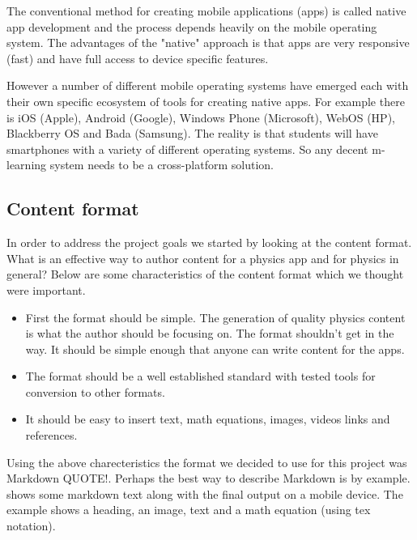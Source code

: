\documentclass[12pt,a4paper]{article}  %
\begin{document}
The conventional method for creating mobile applications (apps) is called native app development and the process depends heavily on the mobile operating system. The advantages of the "native" approach is that apps are very responsive (fast) and have full access to device specific features.

However a number of different mobile operating systems have emerged each with their own specific ecosystem of tools for creating native apps. For example there is iOS (Apple), Android (Google), Windows Phone (Microsoft), WebOS (HP), Blackberry OS and Bada (Samsung). The reality is that students will have smartphones with a variety of different operating systems. So any decent m-learning system needs to be a cross-platform solution.



\subsection{Content format}

In order to address the project goals we started by looking at the content
format. What is an effective way to author content for a physics app and for
physics in general? Below are some characteristics of the content format which
we thought were important.

\begin{itemize}
\item First the format should be simple. The generation of quality physics content is what the author should be focusing on. The format shouldn't get in the way. It should be simple enough that anyone can write content for the apps.
\item The format should be a well established standard with tested tools for conversion to other formats.
\item It should be easy to insert text, math equations, images, videos links and references.
\end{itemize}

Using the above charecteristics the format we decided to use for this project was Markdown QUOTE!. Perhaps the best way to describe Markdown is by example.  shows some markdown text along with the final output on a mobile device. The example shows a heading, an image, text and a math equation (using tex notation).
\end{document}
